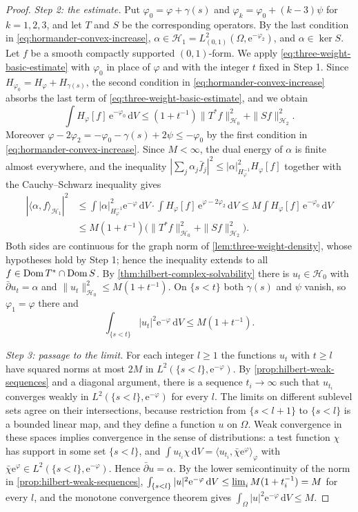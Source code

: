 \begin{proof}
\emph{Step 2: the estimate.} Put $\varphi_0=\varphi+\gamma(s)$ and $\varphi_k=\varphi_0+(k-3)\psi$ for $k=1,2,3$, and let $T$ and $S$ be the corresponding operators. By the last condition in \eqref{eq:hormander-convex-increase}, $\alpha\in \mathcal H_1=L^2_{(0,1)}(\Omega,\mathrm e^{-\varphi_2})$, and $\alpha\in\ker S$. Let $f$ be a smooth compactly supported $(0,1)$-form. We apply \eqref{eq:three-weight-basic-estimate} with $\varphi_0$ in place of $\varphi$ and with the integer $t$ fixed in Step 1. Since $H_{\varphi_0}=H_\varphi+H_{\gamma(s)}$, the second condition in \eqref{eq:hormander-convex-increase} absorbs the last term of \eqref{eq:three-weight-basic-estimate}, and we obtain
\[
 \int H_\varphi[f]\,\mathrm e^{-\varphi_0}\,\mathrm dV
       \le(1+t^{-1})\|T^*f\|_{\mathcal H_0}^2+\|Sf\|_{\mathcal H_2}^2.
\]
Moreover $\varphi-2\varphi_2=-\varphi_0-\gamma(s)+2\psi\le-\varphi_0$ by the first condition in \eqref{eq:hormander-convex-increase}. Since $M<\infty$, the dual energy of $\alpha$ is finite almost everywhere, and the inequality $|\sum_j\alpha_j\bar f_j|^2\le|\alpha|_{H_\varphi^{-1}}^2H_\varphi[f]$ together with the Cauchy--Schwarz inequality gives
\[
 \begin{split}
 |\langle\alpha,f\rangle_{\mathcal H_1}|^2
 &\le\int|\alpha|_{H_\varphi^{-1}}^2\mathrm e^{-\varphi}\,\mathrm dV\cdot\int H_\varphi[f]\,\mathrm e^{\varphi-2\varphi_2}\,\mathrm dV
 \le M\int H_\varphi[f]\,\mathrm e^{-\varphi_0}\,\mathrm dV\\
 &\le M(1+t^{-1})\bigl(\|T^*f\|_{\mathcal H_0}^2+\|Sf\|_{\mathcal H_2}^2\bigr).
 \end{split}
\]
Both sides are continuous for the graph norm of \cref{lem:three-weight-density}, whose hypotheses hold by Step 1; hence the inequality extends to all $f\in\operatorname{Dom} T^*\cap\operatorname{Dom} S$. By \cref{thm:hilbert-complex-solvability} there is $u_t\in \mathcal H_0$ with $\bar\partial u_t=\alpha$ and $\|u_t\|_{\mathcal H_0}^2\le M(1+t^{-1})$. On $\{s<t\}$ both $\gamma(s)$ and $\psi$ vanish, so $\varphi_1=\varphi$ there and
\[
 \int_{\{s<t\}}|u_t|^2\mathrm e^{-\varphi}\,\mathrm dV\le M(1+t^{-1}).
\]

\emph{Step 3: passage to the limit.} For each integer $l\ge1$ the functions $u_t$ with $t\ge l$ have squared norms at most $2M$ in $L^2(\{s<l\},\mathrm e^{-\varphi})$. By \cref{prop:hilbert-weak-sequences} and a diagonal argument, there is a sequence $t_i\to\infty$ such that $u_{t_i}$ converges weakly in $L^2(\{s<l\},\mathrm e^{-\varphi})$ for every $l$. The limits on different sublevel sets agree on their intersections, because restriction from $\{s<l+1\}$ to $\{s<l\}$ is a bounded linear map, and they define a function $u$ on $\Omega$. Weak convergence in these spaces implies convergence in the sense of distributions: a test function $\chi$ has support in some set $\{s<l\}$, and $\int u_{t_i}\chi\,\mathrm dV=\langle u_{t_i},\bar\chi\mathrm e^\varphi\rangle_\varphi$ with $\bar\chi\mathrm e^\varphi\in L^2(\{s<l\},\mathrm e^{-\varphi})$. Hence $\bar\partial u=\alpha$. By the lower semicontinuity of the norm in \cref{prop:hilbert-weak-sequences}, $\int_{\{s<l\}}|u|^2\mathrm e^{-\varphi}\,\mathrm dV\le\varliminf_iM(1+t_i^{-1})=M$ for every $l$, and the monotone convergence theorem gives $\int_\Omega|u|^2\mathrm e^{-\varphi}\,\mathrm dV\le M$.
\end{proof}
